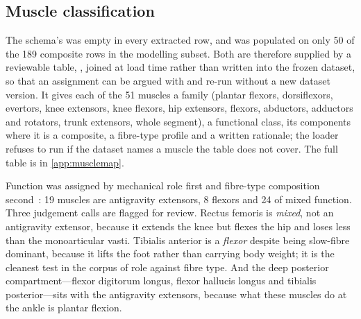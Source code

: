 \subsection{Muscle classification}
\label{sec:muscle-map}

The schema's  was empty in every extracted row, and  was populated
on only 50 of the 189 composite rows in the modelling subset. Both are therefore supplied by a reviewable table,
, joined at load time rather than written into the frozen dataset, so that an assignment
can be argued with and re-run without a new dataset version. It gives each of the 51 muscles a family (plantar
flexors, dorsiflexors, evertors, knee extensors, knee flexors, hip extensors, flexors, abductors, adductors and
rotators, trunk extensors, whole segment), a functional class, its components where it is a composite, a
fibre-type profile and a written rationale; the loader refuses to run if the dataset names a muscle the table does
not cover. The full table is in \cref{app:musclemap}.

Function was assigned by mechanical role first and fibre-type composition second~\citep{johnson1973}: 19 muscles
are antigravity extensors, 8 flexors and 24 of mixed function. Three judgement calls are flagged for review.
Rectus femoris is \emph{mixed}, not an antigravity extensor, because it extends the knee but flexes the hip and
loses less than the monoarticular vasti. Tibialis anterior is a \emph{flexor} despite being slow-fibre dominant,
because it lifts the foot rather than carrying body weight; it is the cleanest test in the corpus of role against
fibre type. And the deep posterior compartment---flexor digitorum longus, flexor hallucis longus and tibialis
posterior---sits with the antigravity extensors, because what these muscles do at the ankle is plantar flexion.
